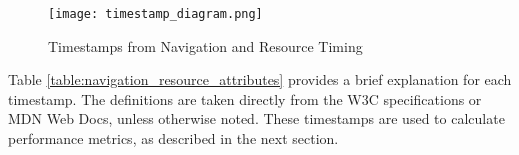 \begin{figure}[h!]
\begin{center}
\texttt{[image: timestamp\_diagram.png]}
\caption{Timestamps from Navigation and Resource Timing}
\label{figure:navigation_resource_timestamps}
\end{center}
\end{figure}


Table \ref{table:navigation_resource_attributes} provides a brief explanation for each timestamp.
The definitions are taken directly from the W3C specifications or MDN Web Docs, unless otherwise noted.
These timestamps are used to calculate performance metrics, as described in the next section.



